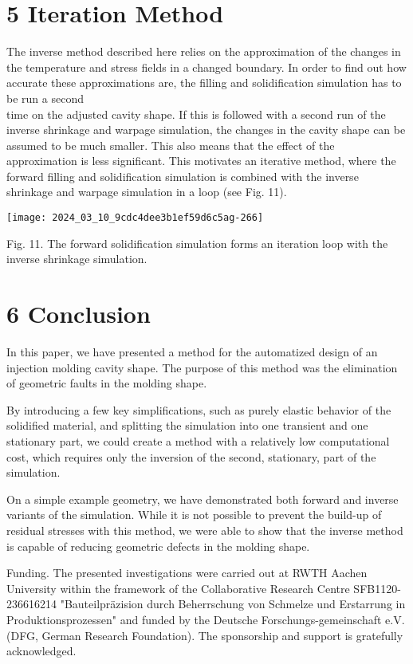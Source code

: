 \documentclass[10pt]{article}
\begin{document}
\section*{5 Iteration Method}
The inverse method described here relies on the approximation of the changes in the temperature and stress fields in a changed boundary. In order to find out how accurate these approximations are, the filling and solidification simulation has to be run a second\\
time on the adjusted cavity shape. If this is followed with a second run of the inverse shrinkage and warpage simulation, the changes in the cavity shape can be assumed to be much smaller. This also means that the effect of the approximation is less significant. This motivates an iterative method, where the forward filling and solidification simulation is combined with the inverse shrinkage and warpage simulation in a loop (see Fig. 11).

\begin{center}
\texttt{[image: 2024\_03\_10\_9cdc4dee3b1ef59d6c5ag-266]}
\end{center}

Fig. 11. The forward solidification simulation forms an iteration loop with the inverse shrinkage simulation.

\section*{6 Conclusion}
In this paper, we have presented a method for the automatized design of an injection molding cavity shape. The purpose of this method was the elimination of geometric faults in the molding shape.

By introducing a few key simplifications, such as purely elastic behavior of the solidified material, and splitting the simulation into one transient and one stationary part, we could create a method with a relatively low computational cost, which requires only the inversion of the second, stationary, part of the simulation.

On a simple example geometry, we have demonstrated both forward and inverse variants of the simulation. While it is not possible to prevent the build-up of residual stresses with this method, we were able to show that the inverse method is capable of reducing geometric defects in the molding shape.

Funding. The presented investigations were carried out at RWTH Aachen University within the framework of the Collaborative Research Centre SFB1120-236616214 "Bauteilpräzision durch Beherrschung von Schmelze und Erstarrung in Produktionsprozessen" and funded by the Deutsche Forschungs-gemeinschaft e.V. (DFG, German Research Foundation). The sponsorship and support is gratefully acknowledged.
\end{document}
